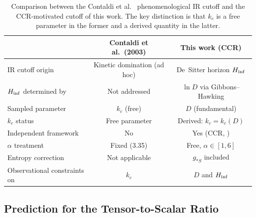 \begin{table}[t]
  \centering
  \begin{tabular}{lcc}
    \hline\hline
    & \textbf{Contaldi et al.\ (2003)} & \textbf{This work (CCR)} \\
    \hline
    IR cutoff origin    & Kinetic domination (ad hoc) & De~Sitter horizon $H_{\rm inf}$ \\
    $H_{\rm inf}$ determined by & Not addressed & $\ln D$ via Gibbons--Hawking \\
    Sampled parameter   & $k_c$ (free)  & $D$ (fundamental) \\
    $k_c$ status        & Free parameter & Derived: $k_c = k_c(D)$ \\
    Independent framework & No           & Yes (CCR, \cite{Chronis:2026}) \\
    $\alpha$ treatment  & Fixed (3.35)  & Free, $\alpha\in[1,6]$ \\
    Entropy correction  & Not applicable & $g_{*S}$ included \\
    Observational constraints on & $k_c$ & $D$ and $H_{\rm inf}$ \\
    \hline\hline
  \end{tabular}
  \caption{Comparison between the Contaldi et al.\ \cite{Contaldi:2003}
    phenomenological IR cutoff and the CCR-motivated cutoff of this work.
    The key distinction is that $k_c$ is a free parameter in the former
    and a derived quantity in the latter.}
  \label{tab:comparison}
\end{table}



\subsection{Prediction for the Tensor-to-Scalar Ratio}
\label{subsec:tensor_ratio}

